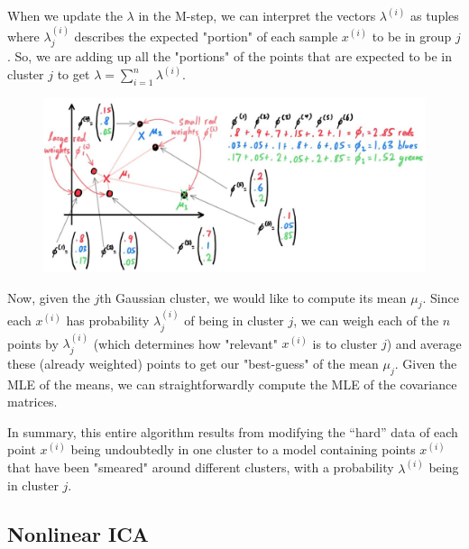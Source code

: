   When we update the $\lambda$ in the M-step, we can interpret the vectors $\lambda^{(i)}$ as tuples where $\lambda^{(i)}_j$ describes the expected "portion" of each sample $x^{(i)}$ to be in group $j$. So, we are adding up all the "portions" of the points that are expected to be in cluster $j$ to get $\lambda= \sum_{i=1}^n \lambda^{(i)}$. 

  \begin{figure}[H]
    \centering 
    \includegraphics[scale=0.2]{img/weighted_means.jpg}
    \caption{}
    \label{fig:weighted_means}
  \end{figure}

  Now, given the $j$th Gaussian cluster, we would like to compute its mean $\mu_j$. Since each $x^{(i)}$ has probability $\lambda^{(i)}_j$ of being in cluster $j$, we can weigh each of the $n$ points by $\lambda^{(i)}_j$ (which determines how "relevant" $x^{(i)}$ is to cluster $j$) and average these (already weighted) points to get our "best-guess" of the mean $\mu_j$. Given the MLE of the means, we can straightforwardly compute the MLE of the covariance matrices. 

  In summary, this entire algorithm results from modifying the ``hard'' data of each point $x^{(i)}$ being undoubtedly in one cluster to a model containing points $x^{(i)}$ that have been "smeared" around different clusters, with a probability $\lambda^{(i)}$ being in cluster $j$. 

\subsection{Nonlinear ICA} 

